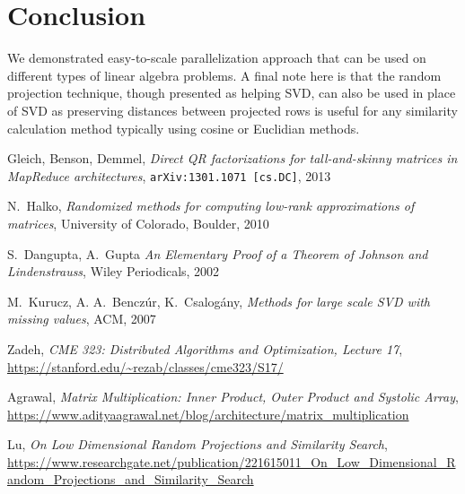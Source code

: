 \documentclass{article}
\begin{document}
\section{Conclusion}

We demonstrated easy-to-scale parallelization approach that can be used on
different types of linear algebra problems. A final note here is that the random
projection technique, though presented as helping SVD, can also be used in place
of SVD \cite{lu} as preserving distances between projected rows is useful for
any similarity calculation method typically using cosine or Euclidian methods.


  

\begin{thebibliography}{1}

Gleich, Benson, Demmel, \emph{Direct QR factorizations for tall-and-skinny
  matrices in MapReduce architectures}, {\tt arXiv:1301.1071 [cs.DC]}, 2013

N.~Halko, \emph{Randomized methods for computing low-rank approximations of
  matrices}, University of Colorado, Boulder, 2010

S.~Dangupta, A.~Gupta \emph{An Elementary Proof of a Theorem of Johnson and
  Lindenstrauss}, Wiley Periodicals, 2002

M.~Kurucz, A. A.~Benczúr, K.~Csalogány, \emph{Methods for large scale SVD with
missing values}, ACM, 2007

Zadeh, \emph{CME 323: Distributed Algorithms and Optimization, Lecture 17}, 
\url{https://stanford.edu/~rezab/classes/cme323/S17/}

Agrawal, \emph{Matrix Multiplication: Inner Product, Outer Product and Systolic Array},
\url{https://www.adityaagrawal.net/blog/architecture/matrix_multiplication}

Lu, \emph{On Low Dimensional Random Projections and Similarity Search},
    \url{https://www.researchgate.net/publication/221615011_On_Low_Dimensional_Random_Projections_and_Similarity_Search}

\end{thebibliography}
\end{document}
